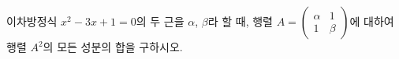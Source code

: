 \hspace*{2mm}\begin{minipage}[t]{\dimexpr\linewidth-2mm\relax}\vspace{0pt}
이차방정식 $x^2-3x+1=0$의 두 근을 $\alpha$, $\beta$라 할 때, 행렬 $A=\begin{pmatrix} \alpha & 1 \\ 1 & \beta \end{pmatrix}$에 대하여 행렬 $A^2$의 모든 성분의 합을 구하시오.\end{minipage}
